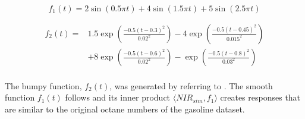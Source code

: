 \documentclass[11pt,twoside,a4paper]{article}
\begin{document}
	\begin{equation}
    	f_1(t) = 2\sin(0.5\pi t) + 4\sin(1.5 \pi t) + 5\sin(2.5 \pi t) 
    \end{equation}

    \begin{equation}
    	\begin{split}
    		f_2(t) = & 1.5 \exp{\left(\frac{-0.5(t-0.3)^2}{0.02^2}\right)} - 4 \exp{\left(\frac{-0.5(t-0.45)^2}{0.015^2}\right)} \\
    				 & + 8 \exp{\left(\frac{-0.5(t-0.6)^2}{0.02^2}\right)} -  \exp{\left(\frac{-0.5(t-0.8)^2}{0.03^2}\right)}
    	\end{split}
    \end{equation}
    \vspace{0.2cm}\\
    
    The bumpy function, $f_2(t)$, was generated by referring to \cite{cardot_bumpyfunction_2002}. The smooth function $f_1(t)$ follows \cite{Reiss_2007b} and its inner product $\langle NIR_{sim}, f_1 \rangle$ creates responses that are similar to the original octane numbers of the gasoline dataset. 
\end{document}
